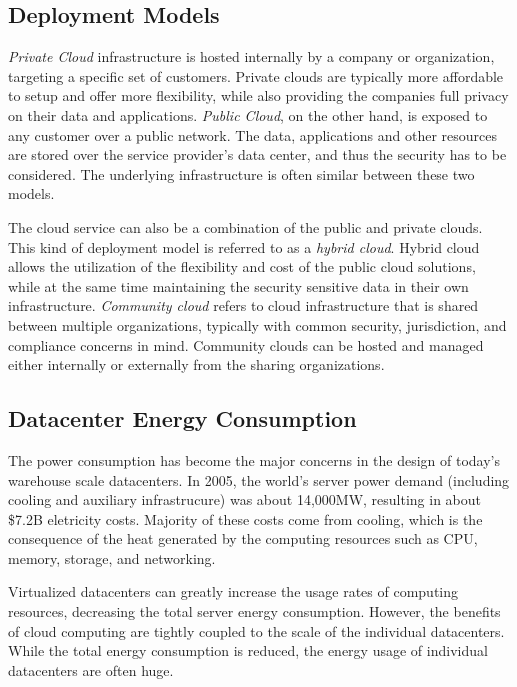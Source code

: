 \subsection{Deployment Models}
\emph{Private Cloud} infrastructure is hosted internally by a company or organization, targeting a specific set of customers. Private clouds are typically more affordable to setup and offer more flexibility, while also providing the companies full privacy on their data and applications. \emph{Public Cloud}, on the other hand, is exposed to any customer over a public network. The data, applications and other resources are stored over the service provider's data center, and thus the security has to be considered. The underlying infrastructure is often similar between these two models.~\cite{Mell:2011:ccdef}

The cloud service can also be a combination of the public and private clouds. This kind of deployment model is referred to as a \emph{hybrid cloud}. Hybrid cloud allows the utilization of the flexibility and cost of the public cloud solutions, while at the same time maintaining the security sensitive data in their own infrastructure. \emph{Community cloud} refers to cloud infrastructure that is shared between multiple organizations, typically with common security, jurisdiction, and compliance concerns in mind. Community clouds can be hosted and managed either internally or externally from the sharing organizations.~\cite{Mell:2011:ccdef}

\subsection{Datacenter Energy Consumption}
The power consumption has become the major concerns in the design of today's warehouse scale datacenters. In 2005, the world's server power demand (including cooling and auxiliary infrastrucure) was about 14,000MW, resulting in about \$7.2B eletricity costs. Majority of these costs come from cooling, which is the consequence of the heat generated by the computing resources such as CPU, memory, storage, and networking.~\cite{Koomey:2007:PC, Fan:2007:PPW}

Virtualized datacenters can greatly increase the usage rates of computing resources, decreasing the total server energy consumption. However, the benefits of cloud computing are tightly coupled to the scale of the individual datacenters. While the total energy consumption is reduced, the energy usage of individual datacenters are often huge.~\cite{Hoelzle:2009:DCI}

